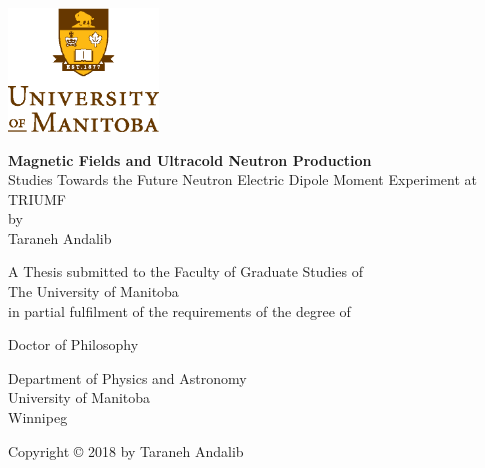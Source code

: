 \documentclass[12pt,a4paper]{book}
\begin{document}

\noindent
\begin{titlepage}
  \begin{center}
         \includegraphics[width=0.3\textwidth]{university.eps}\\
        \vspace*{1cm}
        
        \textbf{Magnetic Fields and Ultracold Neutron Production }
        \\
        Studies Towards the Future Neutron Electric Dipole
        Moment Experiment at TRIUMF
        \\
        by\\
        
        \vspace{1.0cm}
        Taraneh Andalib
        
        \vspace{2.0cm}
        A Thesis submitted to the Faculty of Graduate Studies of\\
        \vspace{0.5cm}
        The University of Manitoba\\
        \vspace{0.5cm}
        in partial fulfilment of the requirements of the degree of
        
        \vspace{1.5cm}
        
       
        Doctor of Philosophy\\
       \vspace{0.5cm}
        
   
        \vspace{0.5cm}
        Department of Physics and Astronomy\\
        University of Manitoba\\
        Winnipeg

        \vspace{3.0cm}
        Copyright © 2018 by Taraneh Andalib
        
    \end{center}
\end{titlepage}
\end{document}
